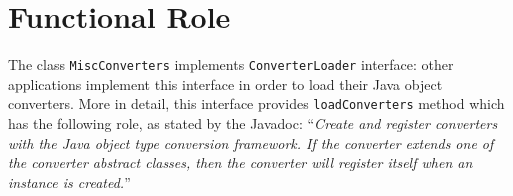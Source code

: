 \section{Functional Role}
The class \texttt{MiscConverters} implements \texttt{ConverterLoader} interface: other applications implement this interface in order to load their Java object converters. More in detail, this interface provides \texttt{loadConverters} method which has the following role, as stated by the Javadoc: \enquote{\textit{Create and register converters with the Java object type conversion framework. If the converter extends one of the converter abstract classes, then the converter will register itself when an instance is created.}}